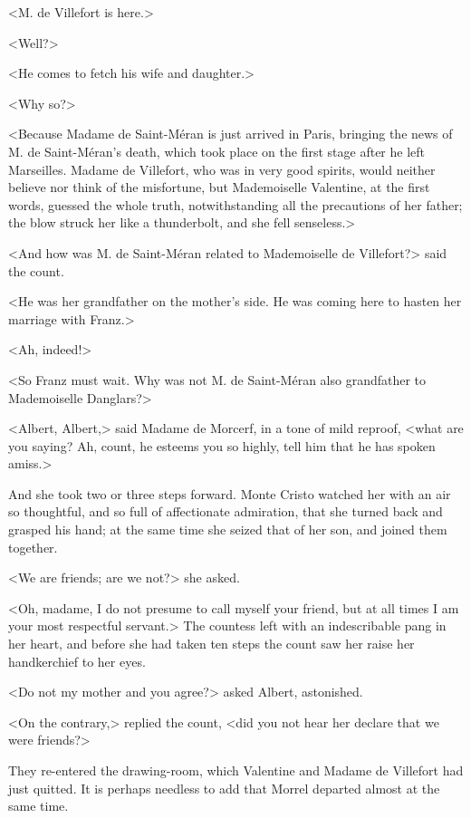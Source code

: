  <M. de Villefort is here.> 

 <Well?> 

 <He comes to fetch his wife and daughter.> 

 <Why so?> 

 <Because Madame de Saint-Méran is just arrived in Paris, bringing the news of M. de Saint-Méran's death, which took place on the first stage after he left Marseilles. Madame de Villefort, who was in very good spirits, would neither believe nor think of the misfortune, but Mademoiselle Valentine, at the first words, guessed the whole truth, notwithstanding all the precautions of her father; the blow struck her like a thunderbolt, and she fell senseless.> 

 <And how was M. de Saint-Méran related to Mademoiselle de Villefort?> said the count. 

 <He was her grandfather on the mother's side. He was coming here to hasten her marriage with Franz.> 

 <Ah, indeed!> 

 <So Franz must wait. Why was not M. de Saint-Méran also grandfather to Mademoiselle Danglars?> 

 <Albert, Albert,> said Madame de Morcerf, in a tone of mild reproof, <what are you saying? Ah, count, he esteems you so highly, tell him that he has spoken amiss.> 

 And she took two or three steps forward. Monte Cristo watched her with an air so thoughtful, and so full of affectionate admiration, that she turned back and grasped his hand; at the same time she seized that of her son, and joined them together. 

 <We are friends; are we not?> she asked. 

 <Oh, madame, I do not presume to call myself your friend, but at all times I am your most respectful servant.> The countess left with an indescribable pang in her heart, and before she had taken ten steps the count saw her raise her handkerchief to her eyes. 

 <Do not my mother and you agree?> asked Albert, astonished. 

 <On the contrary,> replied the count, <did you not hear her declare that we were friends?> 

 They re-entered the drawing-room, which Valentine and Madame de Villefort had just quitted. It is perhaps needless to add that Morrel departed almost at the same time. 
